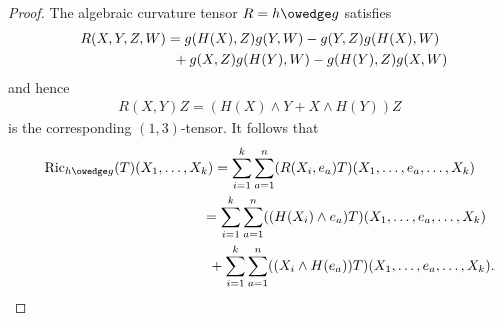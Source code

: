 \documentclass[10pt,a4paper]{amsart}
\numberwithin{equation}{section}
\newcommand{\Ric} {\operatorname{Ric}}
\begin{document}
\begin{proof}The algebraic curvature tensor $R = h \owedge g$ satisfies
\begin{gather*}
R(X,Y,Z,W) =  g(H(X),Z)g(Y,W)-g(Y,Z)g(H(X),W) \\
\hphantom{R(X,Y,Z,W) =}{} +g(X,Z)g(H(Y),W)-g(H(Y),Z)g(X,W)
\end{gather*}
and hence
\begin{gather*}
R(X,Y)Z =  ( H(X) \wedge Y + X \wedge H(Y)  ) Z
\end{gather*}
is the corresponding $(1,3)$-tensor. It follows that
\begin{gather*}
\Ric_{h \owedge g}(T)(X_1, \dots, X_k) =   \sum_{i=1}^k \sum_{a=1}^n  ( R(X_i, e_a)T  ) ( X_1, \dots, e_a, \dots, X_k) \\
\hphantom{\Ric_{h \owedge g}(T)(X_1, \dots, X_k)}{} =   \sum_{i=1}^k \sum_{a=1}^n (( H(X_i) \wedge e_a )T)( X_1, \dots, e_a, \dots, X_k) \\
\hphantom{\Ric_{h \owedge g}(T)(X_1, \dots, X_k)=}{}  + \sum_{i=1}^k \sum_{a=1}^n (( X_i \wedge H(e_a) )T)( X_1, \dots, e_a, \dots, X_k).
\end{gather*}


\end{proof}
\end{document}
